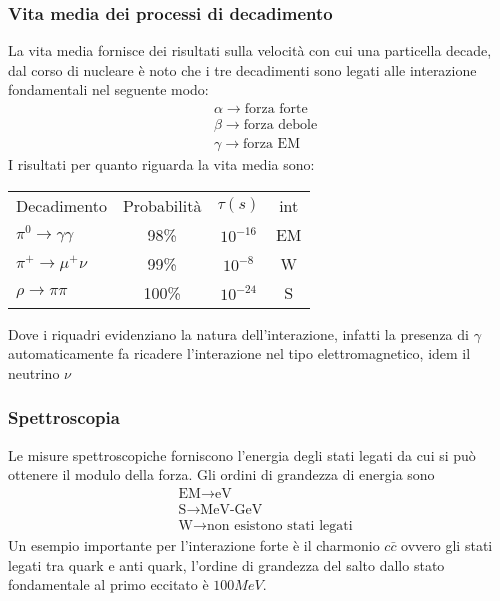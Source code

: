 \documentclass[12pt]{book}
\begin{document}
\subsubsection{Vita media dei processi di decadimento}
La vita media fornisce dei risultati sulla velocità con cui una particella decade, dal corso di nucleare è noto che i tre decadimenti sono legati alle interazione fondamentali nel seguente modo:
\begin{align}
	&\alpha \longrightarrow \text{forza forte}\\
	&\beta \longrightarrow \text{forza debole}\\
	&\gamma \longrightarrow \text{forza EM}
\end{align}
I risultati per quanto riguarda la vita media sono:

\medskip

\begin{tabular}{l|c|c|c}
	Decadimento & Probabilità & $\tau (s)$ & int\\
  $\pi^0 \rightarrow \boxed{\gamma \gamma}$& 98\% & $10^{-16}$& EM\\
  \hline
  $\pi^+ \rightarrow \mu^+ \boxed{\nu}$& 99\% & $10^{-8}$ & W \\
  \hline
  $\rho \rightarrow \pi \pi$& 100\%& $10^{-24}$&S
\end{tabular}

\medskip
Dove i riquadri evidenziano la natura dell'interazione, infatti la presenza di $\gamma$ automaticamente fa ricadere l'interazione nel tipo elettromagnetico, idem il neutrino $\nu$

\subsubsection{Spettroscopia}
Le misure spettroscopiche forniscono l'energia degli stati legati da cui si può ottenere il modulo della forza. Gli ordini di grandezza di energia sono 
\begin{align}
	&\text{EM} \longrightarrow \text{eV}\\
	&\text{S} \longrightarrow \text{MeV-GeV}\\
	&\text{W} \longrightarrow \text{non esistono stati legati}
\end{align}
Un esempio importante per l'interazione forte è il charmonio $c \bar c$ ovvero gli stati legati tra quark e anti quark, l'ordine di grandezza del salto dallo stato fondamentale al primo eccitato è $100MeV$.

\newpage
\end{document}
